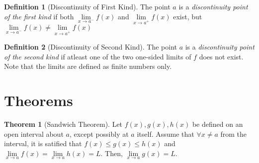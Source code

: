 \documentclass[fleqn]{article}
\theoremstyle{definition}
\newtheorem{definition}{Definition}
\theoremstyle{theorem}
\newtheorem{theorem}{Theorem}
\theoremstyle{remark}
\begin{document}

\begin{definition}[Discontinuity of First Kind]
	The point $a$ is a \emph{discontinuity point of the first kind} if both $\lim\limits_{x \rightarrow a^-} f(x)$ and $\lim\limits_{x \rightarrow a^+} f(x)$ exist, but $\lim\limits_{x \rightarrow a^-} f(x) \neq \lim\limits_{x \rightarrow a^+} f(x)$
\end{definition}

\begin{definition}[Discontinuity of Second Kind]
	The point $a$ is a \emph{discontinuity point of the second kind} if atleast one of the two one-sided limits of $f$ does not exist. \\
	Note that the limits are defined as finite numbers only.
\end{definition}

\section*{Theorems}

\begin{theorem}[Sandwich Theorem] \label{Sandwich Theorem}
	Let $f(x), g(x), h(x)$ be defined on an open interval about $a$, except possibly at $a$ itself. Assume that $\forall x \neq a$ from the interval, it is satified that $f(x) \leq g(x) \leq h(x)$ and $\lim\limits_{x \rightarrow a} f(x) = \lim\limits_{x \rightarrow a} h(x) = L$. Then, $\lim\limits_{x \rightarrow a} g(x) = L$.
\end{theorem}
\end{document}
